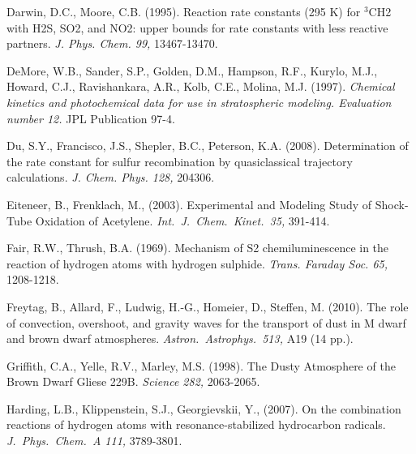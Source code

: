 \documentclass[preprint]{aastex}
\newcounter{reaction}
\begin{document}
\begin{thebibliography}{00}
Darwin, D.C., Moore, C.B. (1995).  Reaction rate constants (295 K) for $^3$CH2 with H2S, SO2, and NO2: upper bounds for rate constants with less reactive partners. {\em J. Phys. Chem. 99,} 13467-13470.

DeMore, W.B., Sander, S.P., Golden, D.M., Hampson, R.F., Kurylo, M.J., Howard, C.J., Ravishankara, A.R., Kolb, C.E., Molina, M.J. (1997). {\em Chemical kinetics and photochemical data for use in stratospheric modeling. Evaluation number 12.}  JPL Publication 97-4.

 Du, S.Y., Francisco, J.S., Shepler, B.C., Peterson, K.A. (2008). Determination of the rate constant for sulfur recombination by quasiclassical trajectory calculations. {\em J. Chem. Phys. 128,} 204306.
 
Eiteneer, B., Frenklach, M., (2003).
  Experimental and Modeling Study of Shock-Tube Oxidation of Acetylene.
  {\em Int.\ J.\ Chem.\ Kinet.\ 35,} 391-414.
 
Fair, R.W., Thrush, B.A. (1969).  Mechanism of S2 chemiluminescence in the reaction of hydrogen atoms with hydrogen sulphide. { \em Trans. Faraday Soc. 65,} 1208-1218.


Freytag, B., Allard, F., Ludwig, H.-G., Homeier, D., Steffen, M. (2010). 
The role of convection, overshoot, and gravity waves for the transport of dust in M dwarf and brown dwarf atmospheres.
{\em Astron.\ Astrophys.\ 513,} A19 (14 pp.).

Griffith, C.A., Yelle, R.V., Marley, M.S. (1998).
The Dusty Atmosphere of the Brown Dwarf Gliese 229B.
{\em Science 282,} 2063-2065.


Harding, L.B., Klippenstein, S.J., Georgievskii, Y., (2007).
On the combination reactions of hydrogen atoms with resonance-stabilized hydrocarbon radicals.
{\em J.\ Phys.\ Chem.\ A 111,} 3789-3801.


\end{thebibliography}
\end{document}
